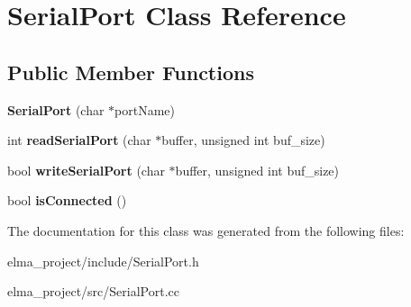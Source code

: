 \hypertarget{class_serial_port}{}\section{Serial\+Port Class Reference}
\label{class_serial_port}
\subsection*{Public Member Functions}
\begin{DoxyCompactItemize}
\item 
\mbox{\label{class_serial_port_a0032f464bf97103666c2e75c3998954c}} 
{\bfseries Serial\+Port} (char $\ast$port\+Name)
\item 
\mbox{\label{class_serial_port_aec18f80eb7267c1be5447cb67a836f52}} 
int {\bfseries read\+Serial\+Port} (char $\ast$buffer, unsigned int buf\+\_\+size)
\item 
\mbox{\label{class_serial_port_a8db28d0cec9ef05db85aef5125d68b45}} 
bool {\bfseries write\+Serial\+Port} (char $\ast$buffer, unsigned int buf\+\_\+size)
\item 
\mbox{\label{class_serial_port_a73883aa801c1302297bf0e123bf90bc7}} 
bool {\bfseries is\+Connected} ()
\end{DoxyCompactItemize}


The documentation for this class was generated from the following files\+:\begin{DoxyCompactItemize}
\item 
elma\+\_\+project/include/Serial\+Port.\+h\item 
elma\+\_\+project/src/Serial\+Port.\+cc\end{DoxyCompactItemize}
